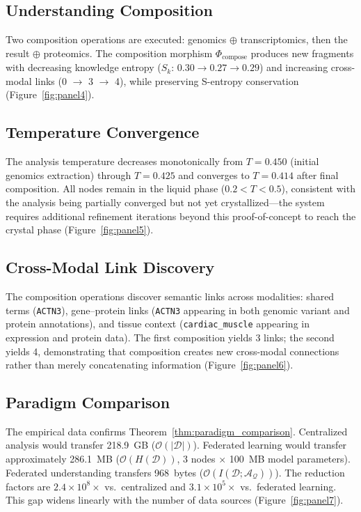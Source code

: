 \documentclass[10pt,twocolumn]{article}
\theoremstyle{definition}
\theoremstyle{remark}
\newcommand{\Sk}{S_k}
\newcommand{\morphism}{\Phi}
\newcommand{\question}{\mathcal{Q}}
\newcommand{\answer}{\mathcal{A}}
\newcommand{\dataset}{\mathcal{D}}
\newcommand{\Sk}{\mathscr{S}_k}
\begin{document}
\subsection{Understanding Composition}

Two composition operations are executed: genomics $\oplus$ transcriptomics, then the result $\oplus$ proteomics. The composition morphism $\morphism_{\text{compose}}$ produces new fragments with decreasing knowledge entropy ($\Sk$: $0.30 \to 0.27 \to 0.29$) and increasing cross-modal links (0 $\to$ 3 $\to$ 4), while preserving S-entropy conservation (Figure~\ref{fig:panel4}).



\subsection{Temperature Convergence}

The analysis temperature decreases monotonically from $T = 0.450$ (initial genomics extraction) through $T = 0.425$ and converges to $T = 0.414$ after final composition. All nodes remain in the liquid phase ($0.2 < T < 0.5$), consistent with the analysis being partially converged but not yet crystallized---the system requires additional refinement iterations beyond this proof-of-concept to reach the crystal phase (Figure~\ref{fig:panel5}).



\subsection{Cross-Modal Link Discovery}

The composition operations discover semantic links across modalities: shared terms (\texttt{ACTN3}), gene--protein links (\texttt{ACTN3} appearing in both genomic variant and protein annotations), and tissue context (\texttt{cardiac\_muscle} appearing in expression and protein data). The first composition yields 3 links; the second yields 4, demonstrating that composition creates new cross-modal connections rather than merely concatenating information (Figure~\ref{fig:panel6}).



\subsection{Paradigm Comparison}

The empirical data confirms Theorem~\ref{thm:paradigm_comparison}. Centralized analysis would transfer 218.9~GB ($\mathcal{O}(|\dataset|)$). Federated learning would transfer approximately 286.1~MB ($\mathcal{O}(H(\dataset))$, 3 nodes $\times$ 100~MB model parameters). Federated understanding transfers 968~bytes ($\mathcal{O}(I(\dataset; \answer_\question))$). The reduction factors are $2.4 \times 10^8\times$ vs.\ centralized and $3.1 \times 10^5\times$ vs.\ federated learning. This gap widens linearly with the number of data sources (Figure~\ref{fig:panel7}).
\end{document}
